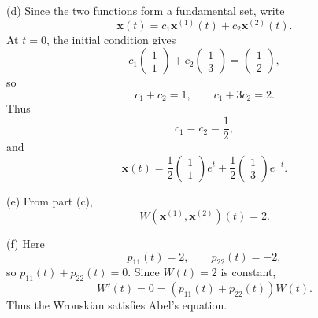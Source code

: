 \documentclass[11pt,oneside]{article}
\begin{document}
\begin{solution}
\medskip
\noindent\textup{(d)} Since the two functions form a fundamental set, write
\[
    \mathbf{x}(t)=c_1\mathbf{x}^{(1)}(t)+c_2\mathbf{x}^{(2)}(t).
\]
At $t=0$, the initial condition gives
\[
    c_1\begin{pmatrix}1\\1\end{pmatrix}
    +c_2\begin{pmatrix}1\\3\end{pmatrix}
    =\begin{pmatrix}1\\2\end{pmatrix},
\]
so
\[
    c_1+c_2=1,
    \qquad
    c_1+3c_2=2.
\]
Thus
\[
    c_1=c_2=\frac12,
\]
and
\[
    \boxed{
        \mathbf{x}(t)
        =\frac12\begin{pmatrix}1\\1\end{pmatrix}e^t
        +\frac12\begin{pmatrix}1\\3\end{pmatrix}e^{-t}
    }.
\]

\medskip
\noindent\textup{(e)} From part (c),
\[
    \boxed{W(\mathbf{x}^{(1)},\mathbf{x}^{(2)})(t)=2}.
\]

\medskip
\noindent\textup{(f)} Here
\[
    p_{11}(t)=2,
    \qquad
    p_{22}(t)=-2,
\]
so $p_{11}(t)+p_{22}(t)=0$. Since $W(t)=2$ is constant,
\[
    W'(t)=0=(p_{11}(t)+p_{22}(t))W(t).
\]
Thus the Wronskian satisfies Abel's equation.
\end{solution}
\end{document}
